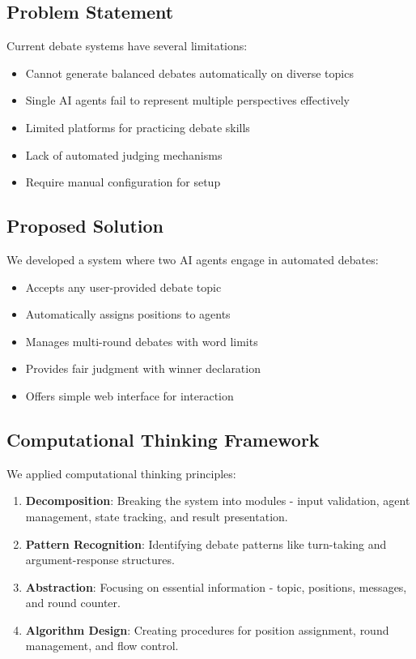 \documentclass[conference]{IEEEtran}
\begin{document}
\subsection{Problem Statement}

Current debate systems have several limitations:
\begin{itemize}
\item Cannot generate balanced debates automatically on diverse topics
\item Single AI agents fail to represent multiple perspectives effectively
\item Limited platforms for practicing debate skills
\item Lack of automated judging mechanisms
\item Require manual configuration for setup
\end{itemize}

\subsection{Proposed Solution}

We developed a system where two AI agents engage in automated debates:
\begin{itemize}
\item Accepts any user-provided debate topic
\item Automatically assigns positions to agents
\item Manages multi-round debates with word limits
\item Provides fair judgment with winner declaration
\item Offers simple web interface for interaction
\end{itemize}

\subsection{Computational Thinking Framework}

We applied computational thinking principles:

\begin{enumerate}
\item \textbf{Decomposition}: Breaking the system into modules - input validation, agent management, state tracking, and result presentation.

\item \textbf{Pattern Recognition}: Identifying debate patterns like turn-taking and argument-response structures.

\item \textbf{Abstraction}: Focusing on essential information - topic, positions, messages, and round counter.

\item \textbf{Algorithm Design}: Creating procedures for position assignment, round management, and flow control.
\end{enumerate}
\end{document}

